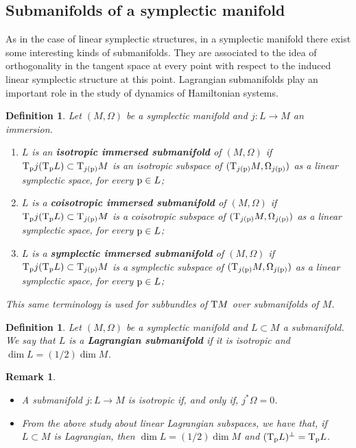 \documentclass[12pt]{report}
\newtheorem{definition}[teor]{Definition}
\newtheorem{remark}[teor]{Remark}
\def\bit{\begin{itemize}}
\def\eit{\end{itemize}}
\def\Tan{{\rm T}}
\begin{document}
\subsection{Submanifolds of a symplectic manifold}


As in the case of linear symplectic structures, in a symplectic manifold there exist some interesting kinds of submanifolds. They are associated to the idea of orthogonality in the tangent space at every point with respect to the induced linear symplectic structure at this point. Lagrangian submanifolds play an important role in the study of dynamics of Hamiltonian systems.

\begin{definition}
Let $(M,\Omega)$ be a symplectic manifold and $j:L\to M$ an immersion.
\begin{enumerate}
\item 
$L$ is an \textbf{isotropic immersed submanifold} of $(M,\Omega)$ if
$\Tan_{\rm p}j(\Tan_{\rm p}L)\subset\Tan_{j(\rm p)}M$ is an isotropic subspace of 
$(\Tan_{j(\rm p)}M,\Omega_{j(\rm p)})$ as a linear symplectic space, for every ${\rm p}\in L$;
\item
$L$ is a \textbf{coisotropic immersed  submanifold} of $(M,\Omega)$ if
$\Tan_{\rm p}j(\Tan_{\rm p}L)\subset\Tan_{j(\rm p)}M$ is a coisotropic subspace of 
$(\Tan_{j(\rm p)}M,\Omega_{j(\rm p)})$ as a linear symplectic space, for every ${\rm p}\in L$;
\item
$L$ is a \textbf{symplectic immersed submanifold} of $(M,\Omega)$ if
$\Tan_{\rm p}j(\Tan_{\rm p}L)\subset\Tan_{j(\rm p)}M$ is a symplectic subspace of 
$(\Tan_{j(\rm p)}M,\Omega_{j(\rm p)})$ as a linear symplectic space, for every ${\rm p}\in L$;
\end{enumerate}
This same terminology is used for subbundles of $\Tan M$ over submanifolds of $M$.
\end{definition}

\begin{definition} 
Let $(M,\Omega)$ be a symplectic manifold and $L\subset M$ a submanifold. We say that $L$ is a \textbf{Lagrangian submanifold}  if it is isotropic and $\dim L=(1/2)\dim M$.\end{definition}

\begin{remark}{\rm 
\bit
\item 
A submanifold
$j\colon L\to M$ is isotropic if, and only if, $j^{*}\Omega=0$.
\item 
From the above study about linear Lagrangian subspaces, we have that, if $L\subset M$ is Lagrangian, then $\dim L=(1/2)\dim M$ and $(\Tan_{\rm p}L)^{\bot}=\Tan_{\rm p}L$.
\eit
}\end{remark}
\end{document}
